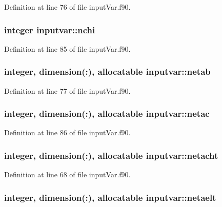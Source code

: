 Definition at line 76 of file input\-Var.\-f90.

\hypertarget{classinputvar_ac34eff504af528e971c7174dfcb39028}{
\subsubsection[{nchi}]{\setlength{\rightskip}{0pt plus 5cm}integer inputvar\-::nchi}}\label{classinputvar_ac34eff504af528e971c7174dfcb39028}


Definition at line 85 of file input\-Var.\-f90.

\hypertarget{classinputvar_af109996c7b379bac5d6c3d89c5b6df1d}{
\subsubsection[{netab}]{\setlength{\rightskip}{0pt plus 5cm}integer, dimension(\-:), allocatable inputvar\-::netab}}\label{classinputvar_af109996c7b379bac5d6c3d89c5b6df1d}


Definition at line 77 of file input\-Var.\-f90.

\hypertarget{classinputvar_ad9998f4f97f100bf6294fb8fa083bfe7}{
\subsubsection[{netac}]{\setlength{\rightskip}{0pt plus 5cm}integer, dimension(\-:), allocatable inputvar\-::netac}}\label{classinputvar_ad9998f4f97f100bf6294fb8fa083bfe7}


Definition at line 86 of file input\-Var.\-f90.

\hypertarget{classinputvar_a7f82eda09f512dfe2f28f82efc5187ad}{
\subsubsection[{netacht}]{\setlength{\rightskip}{0pt plus 5cm}integer, dimension(\-:), allocatable inputvar\-::netacht}}\label{classinputvar_a7f82eda09f512dfe2f28f82efc5187ad}


Definition at line 68 of file input\-Var.\-f90.

\hypertarget{classinputvar_a2bfcb389a7fba156b8c1146150a71f51}{
\subsubsection[{netaelt}]{\setlength{\rightskip}{0pt plus 5cm}integer, dimension(\-:), allocatable inputvar\-::netaelt}}\label{classinputvar_a2bfcb389a7fba156b8c1146150a71f51}


